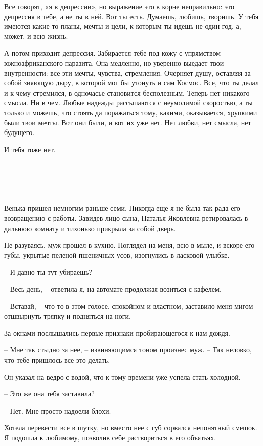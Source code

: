 \documentclass[
]{book}
\begin{document}
Все говорят, «я в депрессии», но выражение это в корне неправильно: это депрессия в тебе, а не ты в ней. Вот ты есть. Думаешь, любишь, творишь. У тебя имеются какие-то планы, мечты и цели, к которым ты идешь не один год, а, может, и всю жизнь.

А потом приходит депрессия. Забирается тебе под кожу с упрямством южноафриканского паразита. Она медленно, но уверенно выедает твои внутренности: все эти мечты, чувства, стремления. Очерняет душу, оставляя за собой зияющую дыру, в которой мог бы утонуть и сам Космос. Все, что ты делал и к чему стремился, в одночасье становится бесполезным. Теперь нет никакого смысла. Ни в чем. Любые надежды рассыпаются с неумолимой скоростью, а ты только и можешь, что стоять да поражаться тому, какими, оказывается, хрупкими были твои мечты. Вот они были, и вот их уже нет. Нет любви, нет смысла, нет будущего.

И тебя тоже нет.

\hypertarget{chapter-64}{%
\chapter{~}\label{chapter-64}}

Венька пришел немногим раньше семи. Никогда еще я не была так рада его возвращению с работы. Завидев лицо сына, Наталья Яковлевна ретировалась в дальнюю комнату и тихонько прикрыла за собой дверь.

Не разуваясь, муж прошел в кухню. Поглядел на меня, всю в мыле, и вскоре его губы, укрытые пеленой пшеничных усов, изогнулись в ласковой улыбке.

-- И давно ты тут убираешь?

-- Весь день, -- ответила я, на автомате продолжая возиться с кафелем.

-- Вставай, -- что-то в этом голосе, спокойном и властном, заставило меня мигом отшвырнуть тряпку и подняться на ноги.

За окнами послышались первые признаки пробирающегося к нам дождя.

-- Мне так стыдно за нее, -- извиняющимся тоном произнес муж. -- Так неловко, что тебе пришлось все это делать.

Он указал на ведро с водой, что к тому времени уже успела стать холодной.

-- Это же она тебя заставила?

-- Нет. Мне просто надоели блохи.

Хотела перевести все в шутку, но вместо нее с губ сорвался непонятный смешок. Я подошла к любимому, позволив себе раствориться в его объятьях.
\end{document}
